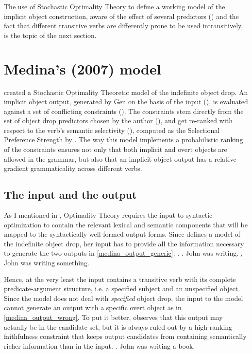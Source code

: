 The use of Stochastic Optimality Theory to define a working model of the implicit object construction, aware of the effect of several predictors () and the fact that different transitive verbs are differently prone to be used intransitively, is the topic of the next section.

\section{Medina's (2007) model} 

\textcite{Medina2007} created a Stochastic Optimality Theoretic model of the indefinite object drop. An implicit object output, generated by Gen on the basis of the input (), is evaluated against a set of conflicting constraints (). The constraints stem directly from the set of object drop predictors chosen by the author (), and get re-ranked with respect to the verb's semantic selectivity (), computed as the Selectional Preference Strength by \textcite{Resnik1993, Resnik1996}. The way this model implements a probabilistic ranking of the constraints ensures not only that both implicit and overt objects are allowed in the grammar, but also that an implicit object output has a relative gradient grammaticality across different verbs.


\subsection{The input and the output} 

As I mentioned in , Optimality Theory requires the input to syntactic optimization to contain the relevant lexical and semantic components that will be mapped to the syntactically well-formed output forms. Since \textcite{Medina2007} defines a model of the indefinite object drop, her input has to provide all the information necessary to generate the two outputs in  \ref{medina_output_generic}:
\ex. \label{medina_output_generic} \a. John was writing.
\b. John was writing something.

Hence, at the very least the input contains a transitive verb with its complete predicate-argument structure, i.e. a specified subject and an unspecified object. Since the model does not deal with \textit{specified} object drop, the input to the model cannot generate an output with a specific overt object as in \ref{medina_output_wrong}. To put it better, \textcite[70-71]{Medina2007} observes that this output may actually be in the candidate set, but it is always ruled out by a high-ranking faithfulness constraint that keeps output candidates from containing semantically richer information than in the input.
\ex. \label{medina_output_wrong} John was writing a book.

